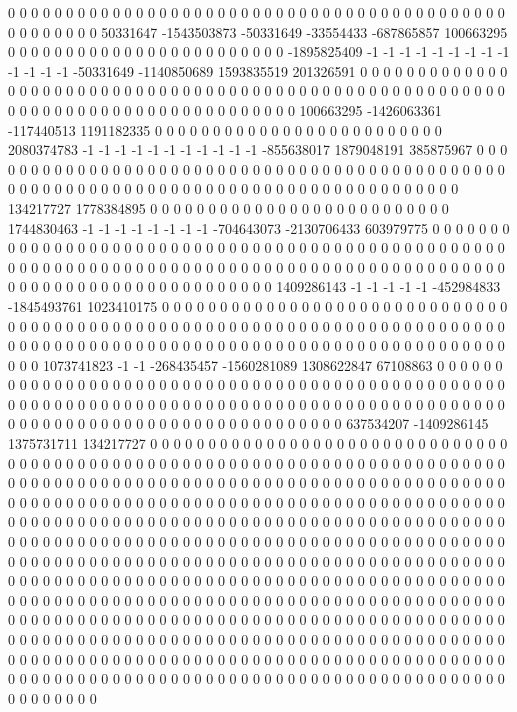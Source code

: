0 0 0 0 0 0 0 0 0 0 0 0 0 0 0 0 0 0 0 0 0 0 0 0 0 0 0 0 0 0 0 0 0 0 0 0 0 0 0 0 0 0 0 0 0 0 0 0 0 0 0 50331647 -1543503873 -50331649 -33554433 -687865857 100663295 0 0 0 0 0 0 0 0 0 0 0 0 0 0 0 0 0 0 0 0 0 0 0 0 -1895825409 -1 -1 -1 -1 -1 -1 -1 -1 -1 -1 -1 -1 -1 -50331649 -1140850689 1593835519 201326591 0 0 0 0 0 0 0 0 0 0 0 0 0 0 0 0 0 0 0 0 0 0 0 0 0 0 0 0 0
0 0 0 0 0 0 0 0 0 0 0 0 0 0 0 0 0 0 0 0 0 0 0 0 0 0 0 0 0 0 0 0 0 0 0 0 0 0 0 0 0 0 0 0 0 0 0 0 0 0 0 0 100663295 -1426063361 -117440513 1191182335 0 0 0 0 0 0 0 0 0 0 0 0 0 0 0 0 0 0 0 0 0 0 0 0 0 2080374783 -1 -1 -1 -1 -1 -1 -1 -1 -1 -1 -1 -855638017 1879048191 385875967 0 0 0 0 0 0 0 0 0 0 0 0 0 0 0 0 0 0 0 0 0 0 0 0 0 0 0 0 0 0 0 0
0 0 0 0 0 0 0 0 0 0 0 0 0 0 0 0 0 0 0 0 0 0 0 0 0 0 0 0 0 0 0 0 0 0 0 0 0 0 0 0 0 0 0 0 0 0 0 0 0 0 0 0 0 134217727 1778384895 0 0 0 0 0 0 0 0 0 0 0 0 0 0 0 0 0 0 0 0 0 0 0 0 0 0 1744830463 -1 -1 -1 -1 -1 -1 -1 -1 -704643073 -2130706433 603979775 0 0 0 0 0 0 0 0 0 0 0 0 0 0 0 0 0 0 0 0 0 0 0 0 0 0 0 0 0 0 0 0 0 0 0
0 0 0 0 0 0 0 0 0 0 0 0 0 0 0 0 0 0 0 0 0 0 0 0 0 0 0 0 0 0 0 0 0 0 0 0 0 0 0 0 0 0 0 0 0 0 0 0 0 0 0 0 0 0 0 0 0 0 0 0 0 0 0 0 0 0 0 0 0 0 0 0 0 0 0 0 0 0 0 0 0 1409286143 -1 -1 -1 -1 -1 -452984833 -1845493761 1023410175 0 0 0 0 0 0 0 0 0 0 0 0 0 0 0 0 0 0 0 0 0 0 0 0 0 0 0 0 0 0 0 0 0 0 0 0 0 0
0 0 0 0 0 0 0 0 0 0 0 0 0 0 0 0 0 0 0 0 0 0 0 0 0 0 0 0 0 0 0 0 0 0 0 0 0 0 0 0 0 0 0 0 0 0 0 0 0 0 0 0 0 0 0 0 0 0 0 0 0 0 0 0 0 0 0 0 0 0 0 0 0 0 0 0 0 0 0 0 0 1073741823 -1 -1 -268435457 -1560281089 1308622847 67108863 0 0 0 0 0 0 0 0 0 0 0 0 0 0 0 0 0 0 0 0 0 0 0 0 0 0 0 0 0 0 0 0 0 0 0 0 0 0 0 0
0 0 0 0 0 0 0 0 0 0 0 0 0 0 0 0 0 0 0 0 0 0 0 0 0 0 0 0 0 0 0 0 0 0 0 0 0 0 0 0 0 0 0 0 0 0 0 0 0 0 0 0 0 0 0 0 0 0 0 0 0 0 0 0 0 0 0 0 0 0 0 0 0 0 0 0 0 0 0 0 0 637534207 -1409286145 1375731711 134217727 0 0 0 0 0 0 0 0 0 0 0 0 0 0 0 0 0 0 0 0 0 0 0 0 0 0 0 0 0 0 0 0 0 0 0 0 0 0 0 0 0 0 0
0 0 0 0 0 0 0 0 0 0 0 0 0 0 0 0 0 0 0 0 0 0 0 0 0 0 0 0 0 0 0 0 0 0 0 0 0 0 0 0 0 0 0 0 0 0 0 0 0 0 0 0 0 0 0 0 0 0 0 0 0 0 0 0 0 0 0 0 0 0 0 0 0 0 0 0 0 0 0 0 0 0 0 0 0 0 0 0 0 0 0 0 0 0 0 0 0 0 0 0 0 0 0 0 0 0 0 0 0 0 0 0 0 0 0 0 0 0 0 0 0 0 0 0 0 0 0 0
0 0 0 0 0 0 0 0 0 0 0 0 0 0 0 0 0 0 0 0 0 0 0 0 0 0 0 0 0 0 0 0 0 0 0 0 0 0 0 0 0 0 0 0 0 0 0 0 0 0 0 0 0 0 0 0 0 0 0 0 0 0 0 0 0 0 0 0 0 0 0 0 0 0 0 0 0 0 0 0 0 0 0 0 0 0 0 0 0 0 0 0 0 0 0 0 0 0 0 0 0 0 0 0 0 0 0 0 0 0 0 0 0 0 0 0 0 0 0 0 0 0 0 0 0 0 0 0
0 0 0 0 0 0 0 0 0 0 0 0 0 0 0 0 0 0 0 0 0 0 0 0 0 0 0 0 0 0 0 0 0 0 0 0 0 0 0 0 0 0 0 0 0 0 0 0 0 0 0 0 0 0 0 0 0 0 0 0 0 0 0 0 0 0 0 0 0 0 0 0 0 0 0 0 0 0 0 0 0 0 0 0 0 0 0 0 0 0 0 0 0 0 0 0 0 0 0 0 0 0 0 0 0 0 0 0 0 0 0 0 0 0 0 0 0 0 0 0 0 0 0 0 0 0 0 0
0 0 0 0 0 0 0 0 0 0 0 0 0 0 0 0 0 0 0 0 0 0 0 0 0 0 0 0 0 0 0 0 0 0 0 0 0 0 0 0 0 0 0 0 0 0 0 0 0 0 0 0 0 0 0 0 0 0 0 0 0 0 0 0 0 0 0 0 0 0 0 0 0 0 0 0 0 0 0 0 0 0 0 0 0 0 0 0 0 0 0 0 0 0 0 0 0 0 0 0 0 0 0 0 0 0 0 0 0 0 0 0 0 0 0 0 0 0 0 0 0 0 0 0 0 0 0 0
